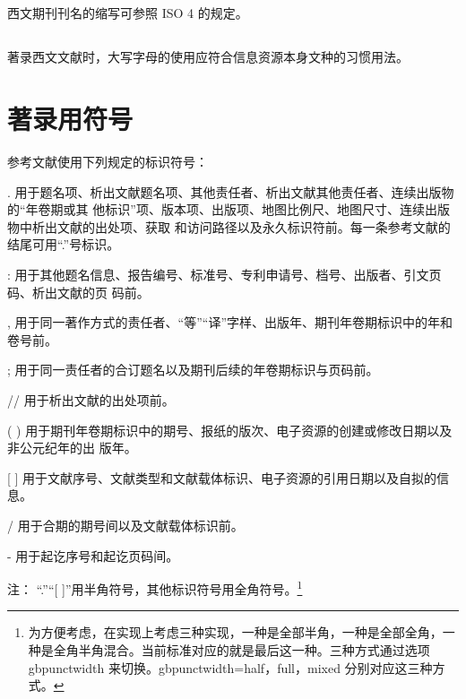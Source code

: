 \documentclass{article}
\begin{document}
\subsection{} 西文期刊刊名的缩写可参照 ISO 4 的规定。

\subsection{} 著录西文文献时，大写字母的使用应符合信息资源本身文种的习惯用法。

\section{著录用符号}

参考文献使用下列规定的标识符号：

. 用于题名项、析出文献题名项、其他责任者、析出文献其他责任者、连续出版物的“年卷期或其
他标识”项、版本项、出版项、地图比例尺、地图尺寸、连续出版物中析出文献的出处项、获取
和访问路径以及永久标识符前。每一条参考文献的结尾可用“.”号标识。

: 用于其他题名信息、报告编号、标准号、专利申请号、档号、出版者、引文页码、析出文献的页
码前。

, 用于同一著作方式的责任者、“等”“译”字样、出版年、期刊年卷期标识中的年和卷号前。

; 用于同一责任者的合订题名以及期刊后续的年卷期标识与页码前。

// 用于析出文献的出处项前。

( ) 用于期刊年卷期标识中的期号、报纸的版次、电子资源的创建或修改日期以及非公元纪年的出
版年。

[ ] 用于文献序号、文献类型和文献载体标识、电子资源的引用日期以及自拟的信息。

/ 用于合期的期号间以及文献载体标识前。

- 用于起讫序号和起讫页码间。

注： “.”“[ ]”用半角符号，其他标识符号用全角符号。\footnote{为方便考虑，在实现上考虑三种实现，一种是全部半角，一种是全部全角，一种是全角半角混合。当前标准对应的就是最后这一种。三种方式通过选项 gbpunctwidth 来切换。gbpunctwidth=half，full，mixed 分别对应这三种方式。}




\titleformat{\subsection}[hang]{\bfseries}{\thesubsection}{1em}{}
\titleformat{\subsubsection}[runin]{\bfseries}{\thesubsubsection}{1em}{}%
\end{document}
